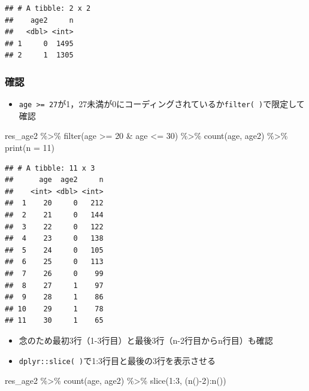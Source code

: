 \documentclass[
  xelatex,ja=standard, b5paper]{bxjsbook}
\newenvironment{Shaded}{\begin{snugshade}}{\end{snugshade}}
\newcommand{\AttributeTok}[1]{\textcolor[rgb]{0.77,0.63,0.00}{#1}}
\newcommand{\DecValTok}[1]{\textcolor[rgb]{0.00,0.00,0.81}{#1}}
\newcommand{\FunctionTok}[1]{\textcolor[rgb]{0.00,0.00,0.00}{#1}}
\newcommand{\NormalTok}[1]{#1}
\newcommand{\SpecialCharTok}[1]{\textcolor[rgb]{0.00,0.00,0.00}{#1}}
\providecommand{\tightlist}{%
  \setlength{\itemsep}{0pt}\setlength{\parskip}{0pt}}
\begin{document}
\begin{verbatim}
## # A tibble: 2 x 2
##    age2     n
##   <dbl> <int>
## 1     0  1495
## 2     1  1305
\end{verbatim}

\hypertarget{ux78baux8a8d-1}{%
\subsubsection{確認}\label{ux78baux8a8d-1}}

\begin{itemize}
\tightlist
\item
  \texttt{age\ \textgreater{}=\ 27}が1，27未満が0にコーディングされているか\texttt{filter(\ )}で限定して確認
\end{itemize}

\begin{Shaded}
\begin{Highlighting}[]
\NormalTok{res\_age2 }\SpecialCharTok{\%\textgreater{}\%} 
  \FunctionTok{filter}\NormalTok{(age }\SpecialCharTok{\textgreater{}=} \DecValTok{20} \SpecialCharTok{\&}\NormalTok{ age }\SpecialCharTok{\textless{}=} \DecValTok{30}\NormalTok{) }\SpecialCharTok{\%\textgreater{}\%} 
  \FunctionTok{count}\NormalTok{(age, age2) }\SpecialCharTok{\%\textgreater{}\%} 
  \FunctionTok{print}\NormalTok{(}\AttributeTok{n =} \DecValTok{11}\NormalTok{)}
\end{Highlighting}
\end{Shaded}

\begin{verbatim}
## # A tibble: 11 x 3
##      age  age2     n
##    <int> <dbl> <int>
##  1    20     0   212
##  2    21     0   144
##  3    22     0   122
##  4    23     0   138
##  5    24     0   105
##  6    25     0   113
##  7    26     0    99
##  8    27     1    97
##  9    28     1    86
## 10    29     1    78
## 11    30     1    65
\end{verbatim}

\begin{itemize}
\tightlist
\item
  念のため最初3行（1-3行目）と最後3行（n-2行目からn行目）も確認
\item
  \texttt{dplyr::slice(\ )}で1:3行目と最後の3行を表示させる
\end{itemize}

\begin{Shaded}
\begin{Highlighting}[]
\NormalTok{res\_age2 }\SpecialCharTok{\%\textgreater{}\%} 
  \FunctionTok{count}\NormalTok{(age, age2) }\SpecialCharTok{\%\textgreater{}\%} 
  \FunctionTok{slice}\NormalTok{(}\DecValTok{1}\SpecialCharTok{:}\DecValTok{3}\NormalTok{, (}\FunctionTok{n}\NormalTok{()}\SpecialCharTok{{-}}\DecValTok{2}\NormalTok{)}\SpecialCharTok{:}\FunctionTok{n}\NormalTok{())}
\end{Highlighting}
\end{Shaded}
\end{document}
